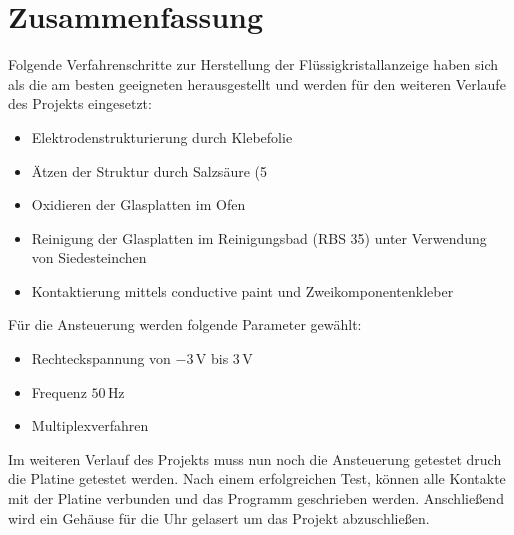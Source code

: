 \section{Zusammenfassung}

Folgende Verfahrenschritte zur Herstellung der Flüssigkristallanzeige haben sich als die am besten geeigneten herausgestellt und werden für den weiteren Verlaufe des Projekts eingesetzt:

\begin{itemize}
\item Elektrodenstrukturierung durch Klebefolie
\item Ätzen der Struktur durch Salzsäure (5%
\item Oxidieren der Glasplatten im Ofen
\item Reinigung der Glasplatten im Reinigungsbad (RBS 35) unter Verwendung von Siedesteinchen
\item Kontaktierung mittels conductive paint und Zweikomponentenkleber\\
\end{itemize}

Für die Ansteuerung werden folgende Parameter gewählt:

\begin{itemize}
\item Rechteckspannung von \(-3\,\textrm{V}\) bis \(3\,\textrm{V}\)
\item Frequenz \(50\,\textrm{Hz}\)
\item Multiplexverfahren\\
\end{itemize}

Im weiteren Verlauf des Projekts muss nun noch die Ansteuerung getestet druch die Platine getestet werden. Nach einem erfolgreichen Test, können alle Kontakte mit der Platine verbunden und das Programm geschrieben werden. Anschließend wird ein Gehäuse für die Uhr gelasert um das Projekt abzuschließen.